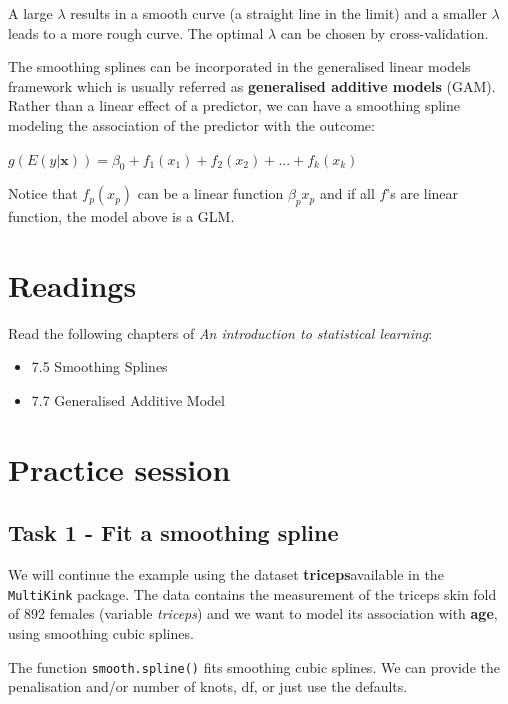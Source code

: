 \documentclass[
]{book}
\providecommand{\tightlist}{%
  \setlength{\itemsep}{0pt}\setlength{\parskip}{0pt}}
\begin{document}
A large \(\lambda\) results in a smooth curve (a straight line in the limit)
and a smaller \(\lambda\) leads to a more rough curve. The optimal \(\lambda\)
can be chosen by cross-validation.

The smoothing splines can be incorporated in the generalised linear models
framework which is usually referred as \textbf{generalised additive models} (GAM).
Rather than a linear effect of a predictor, we can have a smoothing spline
modeling
the association of the predictor with the outcome:

\(g\left(E(y|\mathbf{x} ) \right) = \beta_0 + f_1(x_{1}) + f_2(x_{2}) + ... + f_k(x_{k})\)

Notice that \(f_p(x_p)\) can be a linear function \(\beta_p x_p\) and if all \(f\)'s
are linear function, the model above is a GLM.

\section{Readings}\label{SS2}

Read the following chapters of \emph{An introduction to statistical learning}:

\begin{itemize}
\tightlist
\item
  7.5 Smoothing Splines
\item
  7.7 Generalised Additive Model
\end{itemize}

\section{Practice session}\label{SS3}

\subsection*{Task 1 - Fit a smoothing spline}\label{task-1---fit-a-smoothing-spline}

We will continue the example using the dataset \textbf{triceps}available in
the \texttt{MultiKink} package. The data contains the measurement of the triceps
skin fold of 892 females (variable \emph{triceps}) and we want to model
its association with \textbf{age}, using smoothing cubic splines.

The function \texttt{smooth.spline()} fits smoothing cubic splines. We can provide the
penalisation and/or number of knots, df, or just use the defaults.
\end{document}
